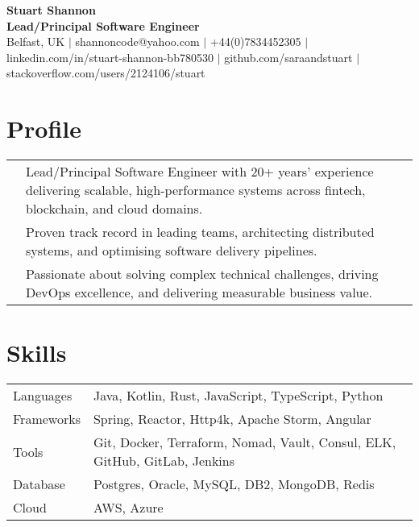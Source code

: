 \documentclass[2pt,a4paper]{article}
\newlength{\datecolumn}
\newlength{\textcolumn}
\begin{document}
\begin{center}
    {\LARGE \textbf{Stuart Shannon}} \\
    {\normalsize \textbf{Lead/Principal Software Engineer}} \\
    \vspace{0.2cm}
    Belfast, UK \quad \(|\) \quad shannoncode@yahoo.com \quad \(|\) \quad +44(0)7834452305 \quad \(|\) \quad linkedin.com/in/stuart-shannon-bb780530 \quad \(|\) \quad github.com/saraandstuart \quad \(|\) \quad stackoverflow.com/users/2124106/stuart 
\end{center}

\section*{Profile}
\begin{tabular}{p{\datecolumn} p{\textcolumn}}
& Lead/Principal Software Engineer with 20+ years’ experience delivering scalable, high-performance systems across fintech, blockchain, and cloud domains. \\
& Proven track record in leading teams, architecting distributed systems, and optimising software delivery pipelines. \\
& Passionate about solving complex technical challenges, driving DevOps excellence, and delivering measurable business value. \\
\end{tabular}

\section*{Skills}
\begin{tabular}{p{\datecolumn} p{\textcolumn}}
Languages  & Java, Kotlin, Rust, JavaScript, TypeScript, Python \\
Frameworks & Spring, Reactor, Http4k, Apache Storm, Angular \\
Tools      & Git, Docker, Terraform, Nomad, Vault, Consul, ELK, GitHub, GitLab, Jenkins \\
Database   & Postgres, Oracle, MySQL, DB2, MongoDB, Redis \\
Cloud      & AWS, Azure \\
\end{tabular}
\end{document}
